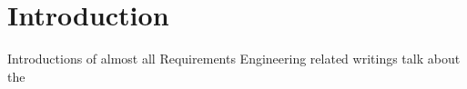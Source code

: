 \chapter{Introduction}
\label{chap:intro}

Introductions of almost all Requirements Engineering related writings talk about the 
